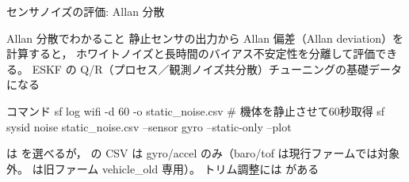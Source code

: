 \begin{frame}[fragile]{センサノイズの評価: Allan 分散\later}
  \begin{block}{Allan 分散でわかること}\small
    静止センサの出力から Allan 偏差（Allan deviation）を計算すると，
    ホワイトノイズと長時間のバイアス不安定性を分離して評価できる。
    ESKF の Q/R（プロセス／観測ノイズ共分散）チューニングの基礎データになる
  \end{block}

  \vspace{0.2em}

  \begin{sflisting}[basicstyle=\ttfamily\scriptsize]{コマンド}
sf log wifi -d 60 -o static_noise.csv   # 機体を静止させて60秒取得
sf sysid noise static_noise.csv --sensor gyro --static-only --plot
  \end{sflisting}

  \vspace{-1.5mm}

  {\footnotesize {} は  を選べるが，
   の CSV は gyro/accel のみ（baro/tof は現行ファームでは対象外。
   は旧ファーム vehicle\_old 専用）。
  トリム調整には  がある}
\end{frame}

